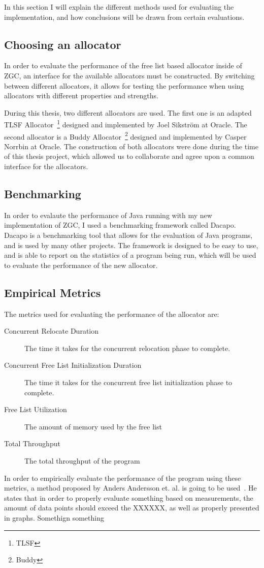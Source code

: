 In this section I will explain the different methods used for evaluating the implementation, and how conclusions will be drawn from certain evaluations.

\subsection{Choosing an allocator}
In order to evaluate the performance of the free list based allocator inside of ZGC, an interface for the available allocators must be constructed. By switching between different allocators, it allows for testing the performance when using allocators with different properties and strengths.

During this thesis, two different allocators are used. The first one is an adapted TLSF Allocator~\footnote{TLSF} designed and implemented by Joel Sikström at Oracle. The second allocator is a Buddy Allocator~\footnote{Buddy} designed and implemented by Casper Norrbin at Oracle. The construction of both allocators were done during the time of this thesis project, which allowed us to collaborate and agree upon a common interface for the allocators.

\subsection{Benchmarking}
In order to evalaute the performance of Java running with my new implementation of ZGC, I used a benchmarking framework called Dacapo. Dacapo is a benchmarking tool that allows for the evaluation of Java programs, and is used by many other projects. The framework is designed to be easy to use, and is able to report on the statistics of a program being run, which will be used to evaluate the performance of the new allocator.

\subsection{Empirical  Metrics}
The metrics used for evaluating the performance of the allocator are:
\begin{description}
    \item [Concurrent Relocate Duration]
        The time it takes for the concurrent relocation phase to complete.
    \item [Concurrent Free List Initialization Duration]
        The time it takes for the concurrent free list initialization phase to complete.
    \item [Free List Utilization]
        The amount of memory used by the free list
    \item [Total Throughput]
        The total throughput of the program
\end{description}
In order to empirically evaluate the performance of the program using these metrics, a method proposed by Anders Andersson et. al. is going to be used~\cite{evaluate:anders}. He states that in order to properly evaluate something based on measurements, the amount of data points should exceed the XXXXXX, as well as properly presented in graphs. Somethign something
